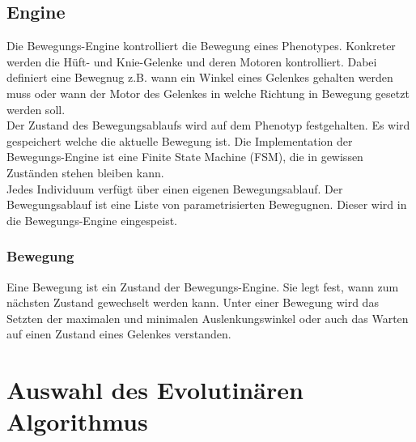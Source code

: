   \subsection{Engine\label{sub:Engine}}

    Die Bewegungs-Engine kontrolliert die Bewegung eines Phenotypes.
    Konkreter werden die Hüft- und Knie-Gelenke und deren Motoren kontrolliert.
    Dabei definiert eine Bewegnug z.B. wann ein Winkel eines Gelenkes gehalten werden muss
    oder wann der Motor des Gelenkes in welche Richtung in Bewegung gesetzt werden soll.
    \\
    Der Zustand des Bewegungsablaufs wird auf dem Phenotyp festgehalten.
    Es wird gespeichert welche die aktuelle Bewegung ist.
    Die Implementation der Bewegungs-Engine ist eine Finite State Machine (FSM),
    die in gewissen Zuständen stehen bleiben kann.
    \\
    Jedes Individuum verfügt über einen eigenen Bewegungsablauf.
    Der Bewegungsablauf ist eine Liste von parametrisierten Bewegugnen.
    Dieser wird in die Bewegungs-Engine eingespeist.

    \subsubsection{Bewegung\label{subsub:EngineMovement}}

      Eine Bewegung ist ein Zustand der Bewegungs-Engine.
      Sie legt fest, wann zum nächsten Zustand gewechselt werden kann.
      Unter einer Bewegung wird das Setzten der maximalen und minimalen Auslenkungswinkel oder auch
      das Warten auf einen Zustand eines Gelenkes verstanden.

  \section{Auswahl des Evolutinären Algorithmus}

